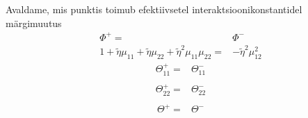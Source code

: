 \documentclass[class=article, crop=false]{standalone}
\begin{document}
Avaldame, mis punktis toimub efektiivsetel interaktsioonikonstantidel märgimuutus
\begin{equation}\label{key}
	\begin{split}
		\Phi^{+} = & \Phi^{-} \\
		1 + \tilde{ \eta} \mu_{11} + \tilde{ \eta} \mu_{22} + \tilde{ \eta}^{2} \mu_{11} \mu_{22} = & - \tilde{ \eta}^{2} \mu_{12}^{2}
	\end{split}
\end{equation}
\begin{equation}\label{key}
	\begin{split}
		\Theta_{11}^{+} = & \Theta_{11}^{-} \\
	\end{split}
\end{equation}
\begin{equation}\label{key}
	\begin{split}
		\Theta_{22}^{+} = & \Theta_{22}^{-} \\
	\end{split}
\end{equation}
\begin{equation}\label{key}
	\begin{split}
		\Theta^{+} = & \Theta^{-} \\
	\end{split}
\end{equation}
\end{document}
